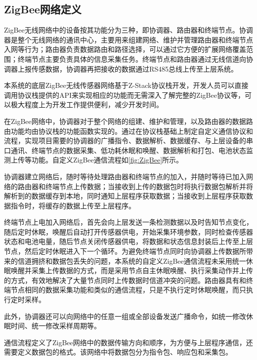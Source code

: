 	\subsection{ZigBee网络定义}
	ZigBee无线网络中的设备按其功能分为三种，即协调器、路由器和终端节点。协调器是整个无线网络的通讯中心，主要用来组建网络、维护并管理路由器和终端节点入网等行为；路由器负责数据路由和路径选择，可以通过它方便的扩展网络覆盖范围；终端节点主要负责具体的信息采集任务。终端节点和路由器通过无线信道向协调器上报传感数据，协调器再把接收的数据通过RS485总线上传至上层系统。
	
本系统的底层ZigBee无线传感器网络基于Z-Stack协议栈开发，开发人员可以直接调用协议栈提供的API来实现相应的功能而无需深入了解完整的ZigBee协议等，可以极大程度上为开发工作提供便利，减少开发时间。
\begin{figure}[!htp]
    \centering
    \resizebox{6cm}{!}{}
\end{figure}
在ZigBee网络中，协调器对于整个网络的组建、维护和管理，以及路由器的数据路由功能均由协议栈的功能函数实现的。通过在协议栈基础上制定自定义通信协议和流程，实现项目需要的协调器的广播指令、数据解析、数据缓存、与上层设备的串口通讯、终端节点的数据采集、低功耗休眠和唤醒、数据解析和打包、电池状态监测上传等功能。自定义ZigBee通信流程如\ref{fig:ZigBee}所示。

协调器建立网络后，随时等待处理路由器和终端节点的加入，并随时等待已加入网络的路由器和终端节点上传数据；当接收到上传的数据包时将执行数据包解析并将解析到的数据缓存到本地，同时通知上层程序获取数据；当接收到上层程序获取数据指令时，将缓存的数据上传至上层程序。

终端节点上电加入网络后，首先会向上层发送一条检测数据以及时告知节点变化，随后定时休眠，唤醒后自动打开传感器供电，开始采集环境参数，同时检查传感器状态和电池电量，随后节点关闭传感器供电，将数据和状态信息封装后上传至上层节点，然后定时休眠进入下一个循环。为避免终端节点同时向协调器上传数据所带来的信道拥挤和数据包丢失的问题，本系统的自定义ZigBee通信流程未采用统一休眠唤醒并采集上传数据的方式，而是采用节点自主休眠唤醒、执行采集动作并上传的方式，有效地解决了大量节点同时上传数据时信道冲突的问题。路由器具有和终端节点相同的数据采集功能和类似的通信流程，只是不执行定时休眠唤醒，而只执行定时采样。

此外，协调器还可以向网络中的任意一组或全部设备发送广播命令，如统一修改休眠时间、统一修改采样周期等。

通信流程定义了ZigBee网络中的数据传输方向和顺序，为方便与上层程序通信，还需要定义数据包的格式。该网络中将数据包分为指令包、响应包和采集包。

